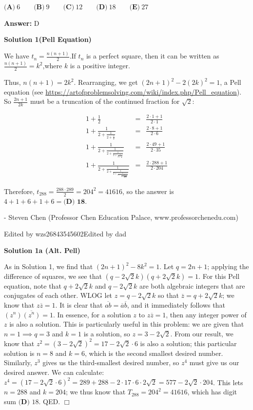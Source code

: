 \begin{enumerate}
 $\textbf{(A)} ~6 \qquad\textbf{(B)} ~9 \qquad\textbf{(C)} ~12 \qquad\textbf{(D)} ~18 \qquad\textbf{(E)} ~27$

 \textbf{Answer: }D



\textbf{Solution 1(Pell Equation)}

We have $t_n = \frac{n (n+1)}{2}$.If $t_n$ is a perfect square, then it can be written as$\frac{n (n+1)}{2} = k^2$,where $k$ is a positive integer.

 Thus, $n (n+1) = 2 k^2$. Rearranging, we get $(2n+1)^2-2(2k)^2=1$, a Pell equation (see \href{https://artofproblemsolving.com/wiki/index.php/Pell\_equation}{https://artofproblemsolving.com/wiki/index.php/Pell\_equation}). So $\frac{2n+1}{2k}$ must be a truncation of the continued fraction for $\sqrt{2}$:

 
 \begin{eqnarray*} 1+\frac12&=&\frac{2\cdot1+1}{2\cdot1}\\ 1+\frac1{2+\frac1{2+\frac12}}&=&\frac{2\cdot8+1}{2\cdot6}\\ 1+\frac1{2+\frac1{2+\frac1{2+\frac1{2+\frac12}}}}&=&\frac{2\cdot49+1}{2\cdot35}\\ 1+\frac1{2+\frac1{2+\frac1{2+\frac1{2+\frac1{2+\frac1{2+\frac12}}}}}}&=&\frac{2\cdot288+1}{2\cdot204} \end{eqnarray*}

 Therefore, $t_{288} = \frac{288\cdot289}{2} = 204^2 = 41616$, so the answer is $4+1+6+1+6=\boxed{\textbf{(D) 18}}$.

 
- Steven Chen (Professor Chen Education Palace, www.professorchenedu.com) 

 Edited by wzs26843545602Edited by dad

 



\textbf{Solution 1a (Alt. Pell)}

As in Solution 1, we find that $(2n+1)^2-8k^2=1$. Let $q=2n+1$; applying the difference of squares, we see that $(q-2\sqrt2k)(q+2\sqrt2k)=1$. For this Pell equation, note that $q+2\sqrt2k$ and $q-2\sqrt2k$ are both algebraic integers that are conjugates of each other. WLOG let $z=q-2\sqrt2k$ so that $\overline z=q+2\sqrt2k$; we know that $z\overline z=1$. It is clear that $\overline{ab}=\overline a\overline b$, and it immediately follows that $\left(z^n\right)\overline{\left(z^n\right)}=1$. In essence, for a solution $z$ to $z\overline z=1$, then any integer power of $z$ is also a solution. This is particularly useful in this problem: we are given that $n=1\implies q=3$ and $k=1$ is a solution, so $z=3-2\sqrt2$. From our result, we know that $z^2=\left(3-2\sqrt2\right)^2=17-2\sqrt2\cdot6$ is also a solution; this particular solution is $n=8$ and $k=6$, which is the second smallest desired number. Similarly, $z^3$ gives us the third-smallest desired number, so $z^4$ must give us our desired answer. We can calculate: $z^4=\left(17-2\sqrt2\cdot6\right)^2=289+288-2\cdot17\cdot6\cdot2\sqrt2=577-2\sqrt2\cdot204$. This lets $n=288$ and $k=204$; we thus know that $T_{288}=204^2=41616$, which has digit sum $\boxed{\textbf{(D) }18}$. QED. $\Box$





\end{enumerate}
